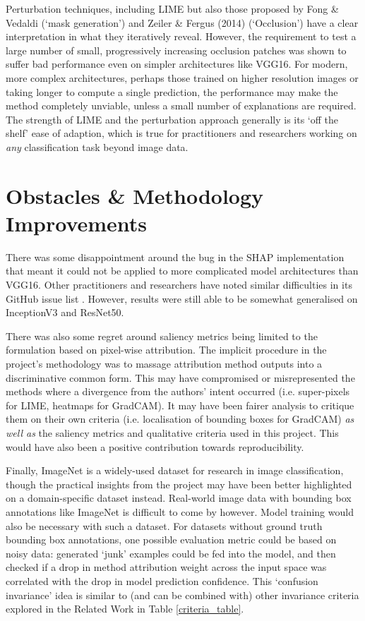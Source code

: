 \documentclass[main]{subfiles}
\begin{document}
Perturbation techniques, including LIME but also those proposed by Fong \& Vedaldi \cite{perturb_fong} (`mask generation') and Zeiler \& Fergus (2014) \cite{zeilerfergus2013} (`Occlusion') have a clear interpretation in what they iteratively reveal. However, the requirement to test a large number of small, progressively increasing occlusion patches was shown to suffer bad performance even on simpler architectures like VGG16. For modern, more complex architectures, perhaps those trained on higher resolution images or taking longer to compute a single prediction, the performance may make the method completely unviable, unless a small number of explanations are required. The strength of LIME and the perturbation approach generally is its `off the shelf' ease of adaption, which is true for practitioners and researchers working on \textit{any} classification task beyond image data.

\section{Obstacles \& Methodology Improvements}

There was some disappointment around the bug in the SHAP implementation that meant it could not be applied to more complicated model architectures than VGG16. Other practitioners and researchers have noted similar difficulties in its GitHub issue list \cite{shaprepo}. However, results were still able to be somewhat generalised on InceptionV3 and ResNet50.

There was also some regret around saliency metrics being limited to the formulation based on pixel-wise attribution. The implicit procedure in the project's methodology was to massage attribution method outputs into a discriminative common form. This may have compromised or misrepresented the methods where a divergence from the authors' intent occurred (i.e. super-pixels for LIME, heatmaps for GradCAM). It may have been fairer analysis to critique them on their own criteria (i.e. localisation of bounding boxes for GradCAM) \textit{as well as} the saliency metrics and qualitative criteria used in this project. This would have also been a positive contribution towards reproducibility.

Finally, ImageNet is a widely-used dataset for research in image classification, though the practical insights from the project may have been better highlighted on a domain-specific dataset instead. Real-world image data with bounding box annotations like ImageNet is difficult to come by however. Model training would also be necessary with such a dataset. For datasets without ground truth bounding box annotations, one possible evaluation metric could be based on noisy data: generated `junk' examples could be fed into the model, and then checked if a drop in method attribution weight across the input space was correlated with the drop in model prediction confidence. This `confusion invariance' idea is similar to (and can be combined with) other invariance criteria explored in the Related Work in Table \ref{criteria_table}.
\end{document}
